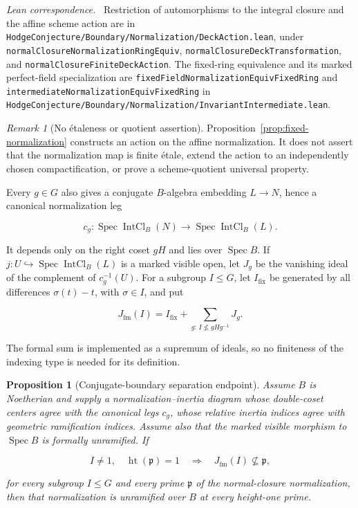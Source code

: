 \documentclass[11pt]{article}
\newtheorem{proposition}[theorem]{Proposition}
\theoremstyle{definition}
\theoremstyle{remark}
\newtheorem*{remark}{Remark}
\newcommand{\leanpath}[1]{\texttt{\nolinkurl{#1}}}
\newcommand{\normsrc}[1]{%
  \leanpath{HodgeConjecture/Boundary/Normalization/#1}}
\newenvironment{leanfiles}
  {\par\medskip\begingroup\footnotesize\raggedright\noindent
   \textit{Lean correspondence.}\ }
  {\par\endgroup\medskip}
\begin{document}
\begin{leanfiles}
Restriction of automorphisms to the integral closure and the affine scheme
action are in \normsrc{DeckAction.lean}, under
\leanpath{normalClosureNormalizationRingEquiv},
\leanpath{normalClosureDeckTransformation}, and
\leanpath{normalClosureFiniteDeckAction}.  The fixed-ring equivalence and its
marked perfect-field specialization are
\leanpath{fixedFieldNormalizationEquivFixedRing} and
\leanpath{intermediateNormalizationEquivFixedRing} in
\normsrc{InvariantIntermediate.lean}.
\end{leanfiles}

\begin{remark}[No \'{e}taleness or quotient assertion]
Proposition~\ref{prop:fixed-normalization} constructs an action on the affine
normalization.  It does not assert that the normalization map is finite
\'etale, extend the action to an independently chosen compactification, or
prove a scheme-quotient universal property.
\end{remark}

Every \(g\in G\) also gives a conjugate \(B\)-algebra embedding
\(L\to N\), hence a canonical normalization leg

\[
  c_g:\operatorname{Spec}\operatorname{IntCl}_B(N)
    \longrightarrow
    \operatorname{Spec}\operatorname{IntCl}_B(L).
\]

It depends only on the right coset \(gH\) and lies over
\(\operatorname{Spec}B\).  If \(j:U\hookrightarrow
\operatorname{Spec}\operatorname{IntCl}_B(L)\) is a marked visible open, let
\(J_g\) be the vanishing ideal of the complement of \(c_g^{-1}(U)\).
For a subgroup \(I\leq G\), let \(I_{\mathrm{fix}}\) be generated by all
differences \(\sigma(t)-t\), with \(\sigma\in I\), and put

\[
  J_{\mathrm{fm}}(I)
  =I_{\mathrm{fix}}+
    \sum_{g:\,I\not\leq gHg^{-1}}J_g.
\]

The formal sum is implemented as a supremum of ideals, so no finiteness of
the indexing type is needed for its definition.

\begin{proposition}[Conjugate-boundary separation endpoint]
\label{prop:conjugate-boundary-separation}
Assume \(B\) is Noetherian and supply a normalization--inertia diagram whose
double-coset centers agree with the canonical legs \(c_g\), whose relative
inertia indices agree with geometric ramification indices.  Assume also that
the marked visible morphism to \(\operatorname{Spec}B\) is formally
unramified.  If

\[
  I\neq 1,\quad \operatorname{ht}(\mathfrak p)=1
  \quad\Longrightarrow\quad
  J_{\mathrm{fm}}(I)\not\subseteq\mathfrak p,
\]

for every subgroup \(I\leq G\) and every prime \(\mathfrak p\) of the
normal-closure normalization, then that normalization is unramified over
\(B\) at every height-one prime.
\end{proposition}
\end{document}
